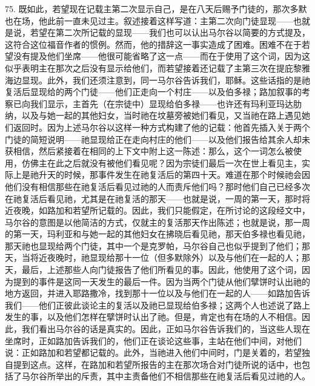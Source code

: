 75. 既如此，若望现在记载主第二次显示自己，是在八天后赐予门徒的，那次多默也在场，他此前一直未见过主。叙述接着这样写道：主第二次向门徒显现——也就是说，若望在第二次所记载的显现——我们也可以认出马尔谷以简要的方式提及，这符合这位福音作者的惯例。然而，他的措辞这一事实造成了困难。困难不在于若望没有提及他们坐席——他很可能省略了这一点——而在于使用了这个词，因为这似乎表明主在那次之后没有显示给他们，而若望接着还记载了主第三次在提庇黎雅海边显现。此外，我们还须注意到，同一马尔谷告诉我们，耶稣。这些话指的是祂复活后显现给的两个门徒——他们正走向一个村庄——以及伯多禄；路加叙事的考察已向我们显示，主首先（在宗徒中）显现给伯多禄——也许还有玛利亚玛达肋纳，以及与她一起的其他妇女，当时祂在坟墓旁被她们看见，又当祂在路上遇见她们返回时。因为上述马尔谷以这样一种方式构建了他的记载：他首先插入关于两个门徒的简短说明——祂显现给正在走向村庄的他们——以及他们报告给其余人却未获相信，然后紧接着在相同的上下文中附上这一陈述：那么，这个一词怎么被使用，仿佛主在此之后就没有被他们看见呢？因为宗徒们最后一次在世上看见主，实际上是祂升天的时候，那事件发生在祂复活后的第四十天。难道在那个时候祂会因他们没有相信那些在祂复活后看见过祂的人而责斥他们吗？那时他们自己已经多次在祂复活后看见祂，尤其是在祂复活的那天——也就是说，一周的第一天，那时将近夜晚，如路加和若望所记载的。因此，我们只能假定，在所讨论的这段经文中，马尔谷的意图是以他简洁的方式，仅就主的复活那天作出陈述；也就是说，那一周的第一天，玛利亚和与她一起的其他妇女在拂晓后看见祂，那天伯多禄也看见祂，那天祂也显现给两个门徒，其中一个是克罗帕，马尔谷自己也似乎提到了他们；那天，当将近夜晚时，祂显现给那十一位（但多默除外）以及与他们在一起的人；那天，最后，上述那些人向门徒报告了他们所看见的事。因此，他使用了这个词，因为提到的事件是这同一天发生的最后一件。因为当两个门徒从他们擘饼时认出祂的地方返回，并进入耶路撒冷，找到那十一位以及与他们在一起的人——如路加告诉我们——他们正彼此谈论主的复活以及祂已显现给伯多禄；这两个人也述说了路上发生的事，以及他们怎样在擘饼时认出了祂。但是，肯定也有在场的人不相信。因此，我们看出马尔谷的话是真实的。因此，正如马尔谷告诉我们的，当这些人现在坐席时，正如路加告诉我们的，他们正在谈论这些事，主站在他们中间，对他们说：正如路加和若望都记载的。此外，当祂进入他们中间时，门是关着的，若望独自提到这点。这样，在路加和若望所报告的主在那次场合对门徒所说的话中，也包括了马尔谷所举出的斥责，其中主责备他们不相信那些在祂复活后看见过祂的人。\par

